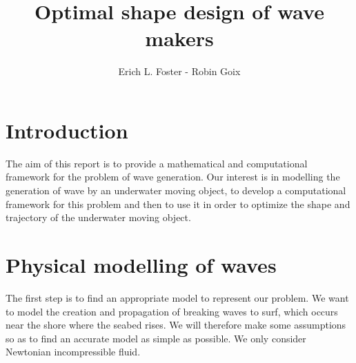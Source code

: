 \documentclass[11pt,a4paper]{article}
\author{Erich L. Foster - Robin Goix}
\title{Optimal shape design of wave makers}
\begin{document}
	\maketitle

	\tableofcontents
	
	\pagebreak
	
	\section*{Introduction}
	The aim of this report is to provide a mathematical and computational framework for the problem of wave generation. Our interest is in modelling the generation of wave by an underwater moving object, to develop a computational framework for this problem and then to use it in order to optimize the shape and trajectory of the underwater moving object.
		
		\pagebreak
		
	\section{Physical modelling of waves}
		The first step is to find an appropriate model to represent our problem. We want to model the creation and propagation of breaking waves to surf, which occurs near the shore where the seabed rises. We will therefore make some assumptions so as to find an accurate model as simple as possible. We only consider Newtonian incompressible fluid.
		
\end{document}
